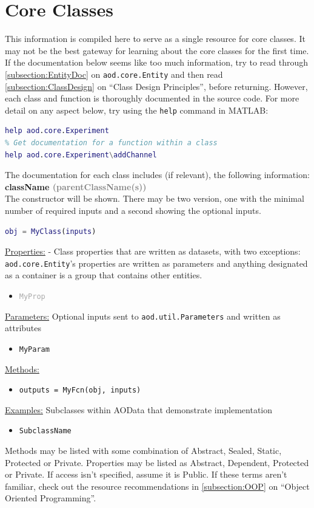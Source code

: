 \documentclass[10pt]{exam}
\newcommand\myurl[1]{\textcolor{blue}{\underline{#1}}}
\newcommand\myparent[1]{\textcolor{gray}{(#1)}}
\newcommand\aodparam[1]{\textcolor{codepurple}{\texttt{#1}}}
\newcommand\aodclass[1]{\textcolor{codeblue}{\texttt{#1}}}
\newcommand\aodprop[1]{\textcolor{darkgray}{\texttt{#1}}}
\newcommand\aodfcn[1]{\textcolor{darkteal}{\texttt{#1}}}
\newcommand\matfcn[1]{\textcolor{darkteal}{\texttt{#1}}}
\newcommand\docheader[1]{\vspace{0.6ex}\noindent\underline{#1}\vspace{0.15ex}}
\begin{document}
\section{Core Classes}
	\label{section:CoreClasses}
	\noindent This information is compiled here to serve as a single resource for core classes. It may not be the best gateway for learning about the core classes for the first time. If the documentation below seems like too much information, try to read through \myurl{\ref{subsection:EntityDoc}} on \aodclass{aod.core.Entity} and then read \myurl{\ref{subsection:ClassDesign}} on ``Class Design Principles'', before returning.  However, each class and function is thoroughly documented in the source code. For more detail on any aspect below, try using the \matfcn{help} command in MATLAB:
	\begin{lstlisting}[language=matlab]
% Get documentation for a class or function
help aod.core.Experiment
% Get documentation for a function within a class
help aod.core.Experiment\addChannel
	\end{lstlisting}
	\noindent The documentation for each class includes (if relevant), the following information:\smallskip\\
	\textbf{className \myparent{parentClassName(s)}}\smallskip\\
	The constructor will be shown. There may be two version, one with the minimal number of required inputs and a second showing the optional inputs.
	\begin{lstlisting}[language=matlab]
obj = MyClass(inputs)
	\end{lstlisting}
	\docheader{Properties:} - Class properties that are written as datasets, with two exceptions: \aodclass{aod.core.Entity}'s properties are written as parameters and anything designated as a container is a group that contains other entities. %
	\begin{itemize}
		\item \aodprop{MyProp}
	\end{itemize}
	\docheader{Parameters:} Optional inputs sent to \aodclass{aod.util.Parameters} and written as attributes
	\begin{itemize}
		\item \aodparam{MyParam}
	\end{itemize}
	\docheader{Methods:}
	\begin{itemize}
		\item \aodfcn{outputs = MyFcn(obj, inputs)}
	\end{itemize}
	\docheader{Examples:} Subclasses within AOData that demonstrate implementation
	\begin{itemize}
		\item \aodclass{SubclassName}
	\end{itemize}
	\noindent Methods may be listed with some combination of Abstract, Sealed, Static, Protected or Private. Properties may be listed as Abstract, Dependent, Protected or Private. If access isn't specified, assume it is Public. If these terms aren't familiar, check out the resource recommendations in \myurl{\ref{subsection:OOP}} on ``Object Oriented Programming''.
\end{document}
